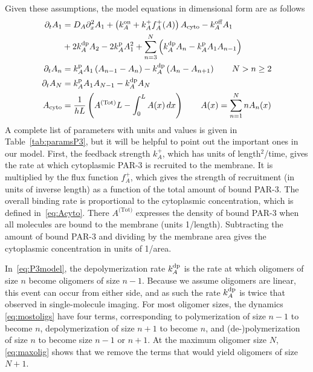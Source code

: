 \documentclass[11pt]{article}
\newcommand{\6}[1]{#1_{\text{6}}}
\newcommand{\3}[1]{#1_{\text{3}}}
\newcommand{\Tot}[1]{#1^\text{(Tot)}}
\newcommand{\A}[1]{#1_A}
\begin{document}
Given these assumptions, the model equations in dimensional form are as follows \cite[Eq.~(1)]{lang2022oligomerization}
\begin{subequations}
\label{eq:P3model}
\begin{align}
\Dt \MA & = \A{D} \Dx^2 \MA + \left(\A{\kon}+\A{\kf}\A{f}^+(A)\right)  \MAC  - \koff_A \MA \\ \nonumber &+ 2\A{\kdp}A_2 -2\A{\kp} \MA^2+ \sum_{n=3}^N  \left(\A{\kdp}A_{n}-\A{\kp}\MA A_{n-1}\right) \\
\label{eq:mostoligs}
\Dt A_n & =\A{\kp}\MA \left(A_{n-1}-A_n\right)- \A{\kdp}\left(A_n-A_{n+1}\right) \qquad N > n \geq 2 \\ 
\label{eq:maxolig}
\Dt A_N & =\A{\kp}\MA A_{N-1}- \A{\kdp}A_N \\  \label{eq:Acyto}
A_\text{cyto} & = \frac{1}{h L} \left(\Tot{A} L - \int_0^L A(x) \, dx \right) \qquad A(x) =\sum_{n=1}^N n A_n(x)
\end{align}
\end{subequations}
A complete list of parameters with units and values is given in Table\ \ref{tab:paramsP3}, but it will be helpful to point out the important ones in our model. First, the feedback strength $k_A^+$, which has units of length$^2$/time, gives the rate at which cytoplasmic PAR-3 is recruited to the membrane. It is multiplied by the flux function $f_A^+$, which gives the strength of recruitment (in units of inverse length) as a function of the total amount of bound PAR-3. The overall binding rate is proportional to the cytoplasmic concentration, which is defined in\ \eqref{eq:Acyto}. There $\Tot{A}$ expresses the density of bound PAR-3 when all molecules are bound to the membrane (units 1/length). Subtracting the amount of bound PAR-3 and dividing by the membrane area gives
the cytoplasmic concentration in units of 1/area.

In\ \eqref{eq:P3model}, the depolymerization rate $k^\text{dp}_A$ is the rate at which oligomers of size $n$ become oligomers of size $n-1$. Because we assume oligomers are linear, this event can occur from either side, and as such the rate $k^\text{dp}_A$ is twice that observed in single-molecule imaging. For most oligomer sizes, the dynamics \eqref{eq:mostoligs} have four terms, corresponding to polymerization of size $n-1$ to become $n$, depolymerization of size $n+1$ to become $n$, and (de-)polymerization of size $n$ to become size $n-1$ or $n+1$. At the maximum oligomer size $N$, \eqref{eq:maxolig} shows that we remove the terms that would yield oligomers of size $N+1$.
\end{document}
